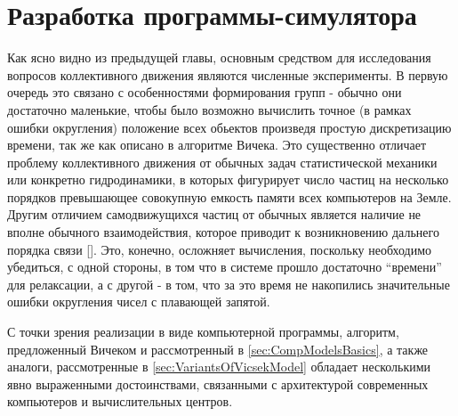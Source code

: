 \section{Разработка программы-симулятора} %
\label{sec:MotivationForProgramm}
    Как ясно видно из предыдущей главы, основным средством для исследования вопросов коллективного движения являются численные эксперименты. В первую очередь это связано с особенностями формирования групп - обычно они достаточно маленькие, чтобы было возможно вычислить точное (в рамках ошибки округления) положение всех обьектов произведя простую дискретизацию времени, так же как описано в алгоритме Вичека. Это существенно отличает проблему коллективного движения от обычных задач статистической механики или конкретно гидродинамики, в которых фигурирует число частиц на несколько порядков превышающее совокупную емкость памяти всех компьютеров на Земле. Другим отличием самодвижущихся частиц от обычных является наличие не вполне обычного взаимодействия, которое приводит к возникновению дальнего порядка связи []. Это, конечно, осложняет вычисления, поскольку необходимо убедиться, с одной стороны, в том что в системе прошло достаточно ``времени'' для релаксации, а с другой - в том, что за это время не накопились значительные ошибки округления чисел с плавающей запятой. 

    С точки зрения реализации в виде компьютерной программы, алгоритм, предложенный Вичеком и рассмотренный в \ref{sec:CompModelsBasics}, а также аналоги, рассмотренные в \ref{sec:VariantsOfVicsekModel} обладает несколькими явно выраженными достоинствами, связанными с архитектурой современных компьютеров и вычислительных центров.
